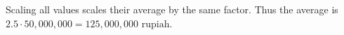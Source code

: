 Scaling all values scales their average by the same factor. Thus the average is $2.5\cdot50{,}000{,}000=\boxed{125{,}000{,}000\text{ rupiah}}$.
